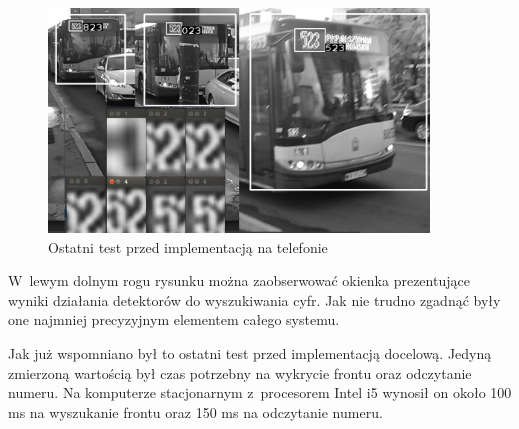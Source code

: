 \begin{figure}[!h]
    \centering
    \includegraphics[width=0.9\textwidth]{img/exp_final_test}
    \caption{Ostatni test przed implementacją na telefonie}
    \label{fig:finaltest}
\end{figure}

W~lewym dolnym rogu rysunku można zaobserwować okienka prezentujące
wyniki działania detektorów do wyszukiwania cyfr. Jak nie trudno
zgadnąć były one najmniej precyzyjnym elementem całego systemu.

Jak już wspomniano był to ostatni test przed implementacją 
docelową. Jedyną zmierzoną wartością był czas potrzebny na wykrycie
frontu oraz odczytanie numeru. Na komputerze stacjonarnym z~procesorem
Intel i5 wynosił on około 100 ms na wyszukanie frontu oraz 150 ms na
odczytanie numeru. 
